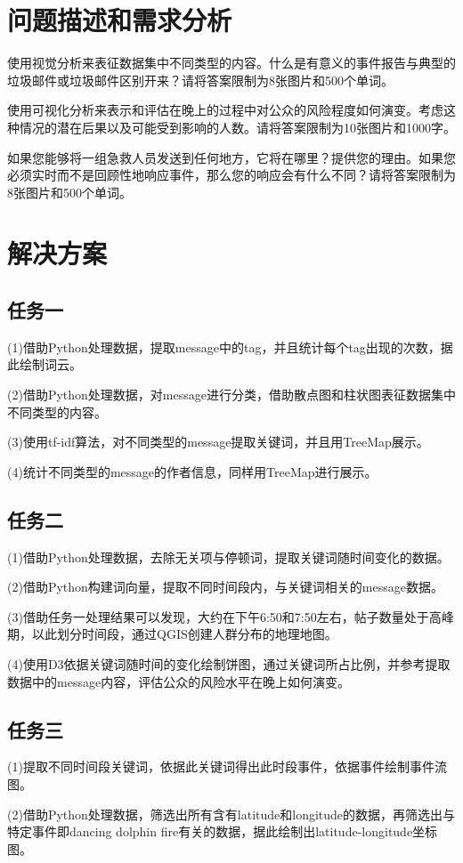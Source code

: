 \documentclass[a4paper]{article}
\begin{document}
\section{问题描述和需求分析}
\label{Data and Task Abstraction}
使用视觉分析来表征数据集中不同类型的内容。什么是有意义的事件报告与典型的垃圾邮件或垃圾邮件区别开来？请将答案限制为8张图片和500个单词。

使用可视化分析来表示和评估在晚上的过程中对公众的风险程度如何演变。考虑这种情况的潜在后果以及可能受到影响的人数。请将答案限制为10张图片和1000字。

如果您能够将一组急救人员发送到任何地方，它将在哪里？提供您的理由。如果您必须实时而不是回顾性地响应事件，那么您的响应会有什么不同？请将答案限制为8张图片和500个单词。

\section{解决方案}
\subsection{任务一}
(1)借助Python处理数据，提取message中的tag，并且统计每个tag出现的次数，据此绘制词云。

(2)借助Python处理数据，对message进行分类，借助散点图和柱状图表征数据集中不同类型的内容。

(3)使用tf-idf算法，对不同类型的message提取关键词，并且用TreeMap展示。

(4)统计不同类型的message的作者信息，同样用TreeMap进行展示。
\subsection{任务二}
(1)借助Python处理数据，去除无关项与停顿词，提取关键词随时间变化的数据。

(2)借助Python构建词向量，提取不同时间段内，与关键词相关的message数据。

(3)借助任务一处理结果可以发现，大约在下午6:50和7:50左右，帖子数量处于高峰期，以此划分时间段，通过QGIS创建人群分布的地理地图。

(4)使用D3依据关键词随时间的变化绘制饼图，通过关键词所占比例，并参考提取数据中的message内容，评估公众的风险水平在晚上如何演变。
\subsection{任务三}
(1)提取不同时间段关键词，依据此关键词得出此时段事件，依据事件绘制事件流图。

(2)借助Python处理数据，筛选出所有含有latitude和longitude的数据，再筛选出与特定事件即dancing dolphin fire有关的数据，据此绘制出latitude-longitude坐标图。
\end{document}
